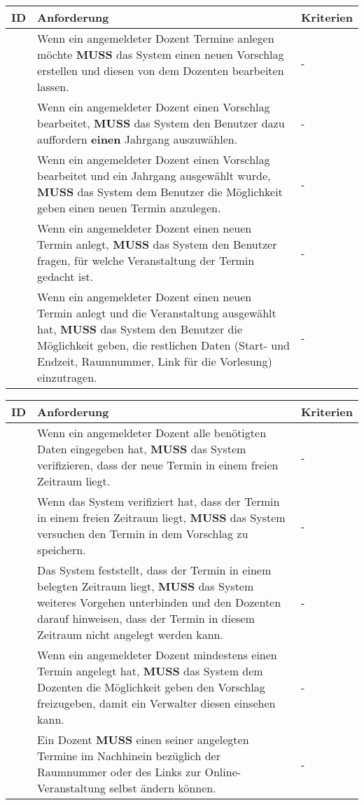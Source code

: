 \begin{tabular} {|p{}|p{}|p{}|}
	\hline
	ID & Anforderung & Kriterien \\
	\hline
	\printfreqnr
	& Wenn ein angemeldeter Dozent Termine anlegen möchte \textbf{MUSS} das System einen neuen Vorschlag erstellen und diesen von dem Dozenten bearbeiten lassen.
	& - \\
	\hline
	\printfreqnr
	& Wenn ein angemeldeter Dozent einen Vorschlag bearbeitet, \textbf{MUSS} das System den Benutzer dazu auffordern \textbf{einen} Jahrgang auszuwählen. 
	& - \\
	\hline
	\printfreqnr
	& Wenn ein angemeldeter Dozent einen Vorschlag bearbeitet und ein Jahrgang ausgewählt wurde, \textbf{MUSS} das System dem Benutzer die Möglichkeit geben einen neuen Termin anzulegen.  
	& - \\
	\hline
	\printfreqnr
	& Wenn ein angemeldeter Dozent einen neuen Termin anlegt, \textbf{MUSS} das System den Benutzer fragen, für welche Veranstaltung der Termin gedacht ist.
	& - \\
	\hline
	\printfreqnr
	& Wenn ein angemeldeter Dozent einen neuen Termin anlegt und die Veranstaltung ausgewählt hat, \textbf{MUSS} das System den Benutzer die Möglichkeit geben, die restlichen Daten (Start- und Endzeit, Raumnummer, Link für die Vorlesung) einzutragen. 
	& - \\
	\hline
\end{tabular}
	
\begin{tabular} {|p{}|p{}|p{}|}
	\hline
	ID & Anforderung & Kriterien \\
	\hline
	\printfreqnr
	& Wenn ein angemeldeter Dozent alle benötigten Daten eingegeben hat, \textbf{MUSS} das System verifizieren, dass der neue Termin in einem freien Zeitraum liegt.
	& - \\
	\hline
	\printfreqnr
	& Wenn das System verifiziert hat, dass der Termin in einem freien Zeitraum liegt, \textbf{MUSS} das System versuchen den Termin in dem Vorschlag zu speichern.
	& - \\
	\hline
	\printfreqnr
	& Das System feststellt, dass der Termin in einem belegten Zeitraum liegt, \textbf{MUSS} das System weiteres Vorgehen unterbinden und den Dozenten darauf hinweisen, dass der Termin in diesem Zeitraum nicht angelegt werden kann.
	& - \\
	\hline
	\printfreqnr
	& Wenn ein angemeldeter Dozent mindestens einen Termin angelegt hat, \textbf{MUSS} das System dem Dozenten die Möglichkeit geben den Vorschlag freizugeben, damit ein Verwalter diesen einsehen kann.
	& - \\
	\hline
	\printfreqnr
	& Ein Dozent \textbf{MUSS} einen seiner angelegten Termine im Nachhinein bezüglich der Raumnummer oder des Links zur Online-Veranstaltung selbst ändern können.
	& - \\
	\hline
\end{tabular}


